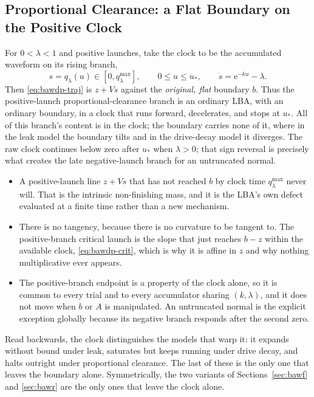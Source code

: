 \documentclass[12pt]{article}
\newcommand{\e}{\mathrm{e}}
\theoremstyle{remark}
\begin{document}
\subsection{Proportional Clearance: a Flat Boundary on the Positive Clock}
For $0<\lambda<1$ and positive launches, take the clock to be the accumulated waveform on its rising branch,
\begin{equation}
  s=q_{\lambda}(u)\in[0,q_{\lambda}^{\max}],\qquad 0\le u\le u_{*},
  \qquad \dot s=\e^{-ku}-\lambda.
\end{equation}
Then \eqref{eq:bawdp-traj} is $z+Vs$ against the \emph{original, flat} boundary $b$. Thus the positive-launch proportional-clearance branch is an ordinary LBA, with an ordinary boundary, in a clock that runs forward, decelerates, and stops at $u_{*}$. All of this branch's content is in the clock; the boundary carries none of it, where in the leak model the boundary tilts and in the drive-decay model it diverges. The raw clock continues below zero after $u_{*}$ when $\lambda>0$; that sign reversal is precisely what creates the late negative-launch branch for an untruncated normal.
\begin{itemize}
  \item A positive-launch line $z+Vs$ that has not reached $b$ by clock time $q_{\lambda}^{\max}$ never will. That is the intrinsic non-finishing mass, and it is the LBA's own defect evaluated at a finite time rather than a new mechanism.
  \item There is no tangency, because there is no curvature to be tangent to. The positive-branch critical launch is the slope that just reaches $b-z$ within the available clock, \eqref{eq:bawdp-crit}, which is why it is affine in $z$ and why nothing multiplicative ever appears.
  \item The positive-branch endpoint is a property of the clock alone, so it is common to every trial and to every accumulator sharing $(k,\lambda)$, and it does not move when $b$ or $A$ is manipulated. An untruncated normal is the explicit exception globally because its negative branch responds after the second zero.
\end{itemize}
Read backwards, the clock distinguishes the models that warp it: it expands without bound under leak, saturates but keeps running under drive decay, and halts outright under proportional clearance. The last of these is the only one that leaves the boundary alone. Symmetrically, the two variants of Sections~\ref{sec:bawf} and \ref{sec:bawr} are the only ones that leave the clock alone.
\end{document}
